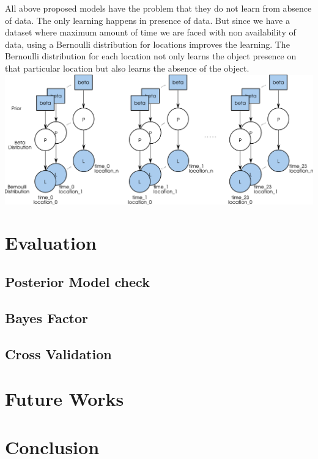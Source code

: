 \documentclass{llncs}
\begin{document}
All above proposed models have the problem that they do not learn from absence of data. The only learning happens in presence of data. But since we have a dataset where maximum amount of time we are faced with non availability of data, using a Bernoulli distribution for locations improves the learning. The Bernoulli distribution for each location not only learns the object presence on that particular location but also learns the absence of the object.
\includegraphics[width=\textwidth]{beta_bernoulli.png}
%
\section{Evaluation}
\subsection{Posterior Model check}
\subsection{Bayes Factor}
\subsection{Cross Validation}

\section{Future Works}

\section{Conclusion}
%
 

\end{document}
